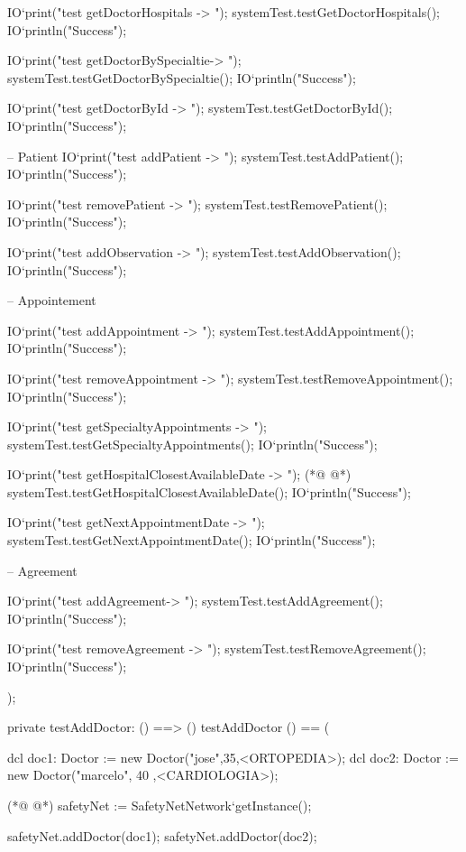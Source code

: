 \begin{vdmpp}[breaklines=true]
  IO`print("test getDoctorHospitals -> ");
  systemTest.testGetDoctorHospitals();
  IO`println("Success");
  
  IO`print("test getDoctorBySpecialtie-> ");
  systemTest.testGetDoctorBySpecialtie();
  IO`println("Success");
  
  IO`print("test getDoctorById -> ");
  systemTest.testGetDoctorById();
  IO`println("Success");
  
  -- Patient
  IO`print("test addPatient -> ");
  systemTest.testAddPatient();
  IO`println("Success");
  
  IO`print("test removePatient -> ");
  systemTest.testRemovePatient();
  IO`println("Success");
  
  IO`print("test addObservation -> ");
  systemTest.testAddObservation();
  IO`println("Success");
  
  
  -- Appointement
  
  IO`print("test addAppointment -> ");
  systemTest.testAddAppointment();
  IO`println("Success");
    
  IO`print("test removeAppointment -> ");
  systemTest.testRemoveAppointment();
  IO`println("Success");
  
  IO`print("test getSpecialtyAppointments -> ");
  systemTest.testGetSpecialtyAppointments();
  IO`println("Success");
  
  IO`print("test getHospitalClosestAvailableDate -> ");
(*@
\label{testAddDoctor:117}
@*)
  systemTest.testGetHospitalClosestAvailableDate();
  IO`println("Success");
  
  IO`print("test getNextAppointmentDate -> ");
  systemTest.testGetNextAppointmentDate();
  IO`println("Success");
  
  -- Agreement
  
  IO`print("test addAgreement-> ");
  systemTest.testAddAgreement();
  IO`println("Success");
    
  IO`print("test removeAgreement -> ");
  systemTest.testRemoveAgreement();
  IO`println("Success");
   
);


private testAddDoctor: () ==> ()
 testAddDoctor () == (
 
  dcl doc1: Doctor := new Doctor("jose",35,<ORTOPEDIA>);
  dcl doc2: Doctor := new Doctor("marcelo", 40 ,<CARDIOLOGIA>);
  
(*@
\label{testGetAllDoctors:143}
@*)
  safetyNet := SafetyNetNetwork`getInstance();
   
  safetyNet.addDoctor(doc1);
  safetyNet.addDoctor(doc2);
  

\end{vdmpp}
